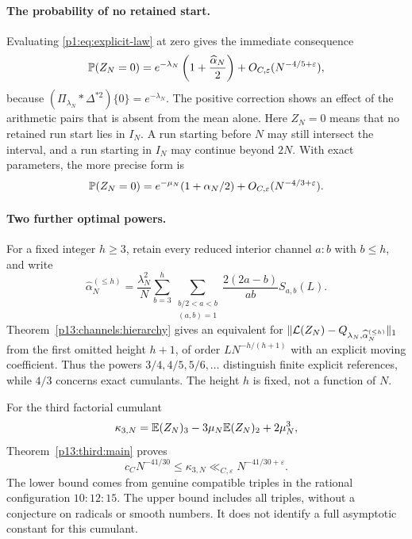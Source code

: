 \paragraph{The probability of no retained start.}
Evaluating \eqref{p1:eq:explicit-law} at zero gives the immediate
consequence
\begin{equation}
 \P(Z_N=0)=e^{-\lambda_N}
       \left(1+\frac{\widehat\alpha_N}{2}\right)
       +O_{C,\varepsilon}(N^{-4/5+\varepsilon}),
 \label{p1:eq:no-start}
\end{equation}
because \((\Pi_{\lambda_N}*\Delta^{*2})\{0\}=e^{-\lambda_N}\).
The positive correction shows an effect of the arithmetic pairs
that is absent from the mean alone. Here \(Z_N=0\) means that
no retained run start lies in \(I_N\). A run starting before
\(N\) may still intersect the interval, and a run starting in
\(I_N\) may continue beyond \(2N\).
With exact parameters, the more precise form is
\[
 \P(Z_N=0)=e^{-\mu_N}(1+\alpha_N/2)
                  +O_{C,\varepsilon}(N^{-4/3+\varepsilon}).
\]

\paragraph{Two further optimal powers.}
For a fixed integer \(h\ge3\), retain every reduced interior
channel \(a:b\) with \(b\le h\), and write
\[
 \widehat\alpha_N^{(\le h)}
   =\frac{\lambda_N^2}{N}
      \sum_{b=3}^{h}
      \sum_{\substack{b/2<a<b\\(a,b)=1}}
                  \frac{2(2a-b)}{ab}S_{a,b}(L).
\]
Theorem~\ref{p13:channels:hierarchy} gives an equivalent for
\(\|\Law(Z_N)-Q_{\lambda_N,\widehat\alpha_N^{(\le h)}}\|_1\)
from the first omitted height \(h+1\), of order
\(LN^{-h/(h+1)}\) with an explicit moving coefficient.
Thus the powers \(3/4,4/5,5/6,\ldots\) distinguish finite
explicit references, while \(4/3\) concerns exact cumulants.
The height \(h\) is fixed, not a function of \(N\).

For the third factorial cumulant
\[
 \kappa_{3,N}=\E(Z_N)_3-3\mu_N\E(Z_N)_2+2\mu_N^3,
\]
Theorem~\ref{p13:third:main} proves
\[
 c_C N^{-41/30}\le\kappa_{3,N}
                  \ll_{C,\varepsilon}N^{-41/30+\varepsilon}.
\]
The lower bound comes from genuine compatible triples in
the rational configuration \(10:12:15\). The upper bound
includes all triples, without a conjecture on radicals or
smooth numbers. It does not identify a full asymptotic
constant for this cumulant.

